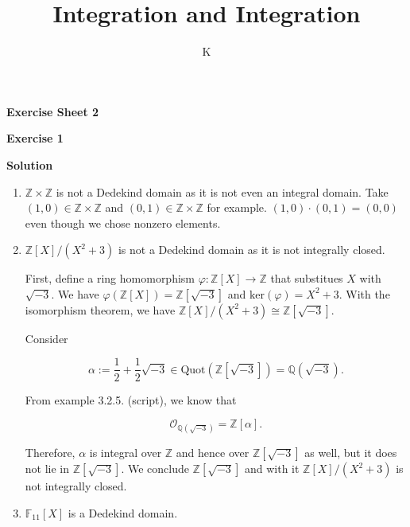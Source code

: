 \documentclass[a4paper]{article}
\title{Integration and Integration}
\author{K}
\theoremstyle{definition}
\begin{document}
\begin{center}
    \noindent\textbf{Exercise Sheet 2}
\end{center}
\noindent\textbf{Exercise 1}

\noindent\textbf{Solution}

\begin{enumerate}
    \item \(\mathbb{Z}\times\mathbb{Z}\) is not a Dedekind domain as it is not even an integral domain. Take \((1, 0) \in \mathbb{Z}\times\mathbb{Z}\) and \((0, 1) \in \mathbb{Z}\times\mathbb{Z}\) for example. \((1, 0) \cdot (0, 1) = (0, 0)\) even though we chose nonzero elements.
    \item \(\mathbb{Z}[X] / (X^2 + 3)\) is not a Dedekind domain as it is not integrally closed.

    First, define a ring homomorphism \(\varphi: \mathbb{Z}[X] \rightarrow \mathbb{Z}\) that substitues \(X\) with \(\sqrt{-3}\). We have \(\varphi(\mathbb{Z}[X]) = \mathbb{Z}[\sqrt{-3}]\) and \(\text{ker} (\varphi) = X^2 + 3\). With the isomorphism theorem, we have \(\mathbb{Z}[X] / (X^2 + 3) \cong \mathbb{Z}[\sqrt{-3}]\).

    Consider

    \begin{equation}
        \alpha := \frac{1}{2} + \frac{1}{2} \sqrt{-3} \in \text{Quot}(\mathbb{Z}[\sqrt{-3}]) = \mathbb{Q}(\sqrt{-3}) \text{.}
    \end{equation}

    From example 3.2.5. (script), we know that

    \begin{equation}
        \mathcal{O}_{\mathbb{Q}(\sqrt{-3})} = \mathbb{Z}[\alpha] \text{.}
    \end{equation}
    
    Therefore, \(\alpha\) is integral over \(\mathbb{Z}\) and hence over \(\mathbb{Z}[\sqrt{-3}]\) as well, but it does not lie in \(\mathbb{Z}[\sqrt{-3}]\). We conclude \(\mathbb{Z}[\sqrt{-3}]\) and with it \(\mathbb{Z}[X] / (X^2 + 3)\) is not integrally closed.
    \item \(\mathbb{F}_{11}[X]\) is a Dedekind domain.
    

\end{enumerate}
\end{document}
